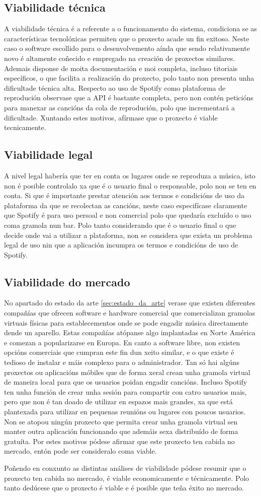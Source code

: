 \subsection{Viabilidade técnica}
A viabilidade técnica é a referente a o funcionamento do sistema, condiciona se as características tecnolóxicas permiten que o proxecto acade un fin exitoso. Neste caso o software escollido para o desenvolvemento aínda que sendo relativamente novo é altamente coñecido e empregado na creación de proxectos similares. Ademais disponse de moita documentación e moi completa, incluso titoriais específicos, o que facilita a realización do proxecto, polo tanto non presenta unha dificultade técnica alta. Respecto ao uso de Spotify como plataforma de reprodución observase que a API é bastante completa, pero non contén peticións para manexar as cancións da cola de reprodución, polo que incrementará a dificultade. Xuntando estes motivos, afírmase que o proxecto é viable tecnicamente.

\subsection{Viabilidade legal}
A nivel legal habería que ter en conta os lugares onde se reproduza a música, isto non é posible controlalo xa que é o usuario final o responsable, polo non se ten en conta. Si que é importante prestar atención aos termos e condicións de uso da plataforma da que se recolectan as cancións, neste caso especifícase claramente que Spotify é para uso persoal e non comercial polo que quedaría excluído o uso coma gramola nun bar. Polo tanto considerando que é o usuario final o que decide onde vai a utilizar a plataforma, non se considera que exista un problema legal de uso nin que a aplicación incumpra os termos e condicións de uso de Spotify.

\subsection{Viabilidade do mercado}
No apartado do estado da arte \ref{sec:estado_da_arte} verase que existen diferentes compañías que ofrecen software e hardware comercial que comercializan gramolas virtuais físicas para establecementos onde se pode engadir música directamente dende un aparello. Estas compañías atópanse algo implantadas en Norte América e comezan a popularizarse en Europa. En canto a software libre, non existen opcións comerciais que cumpran este fin dun xeito similar, e o que existe é tedioso de instalar e máis complexo para o administrador. Tan só hai algúns proxectos ou aplicacións móbiles que de forma xeral crean unha gramola virtual de maneira local para que os usuarios poidan engadir cancións. Incluso Spotify ten unha función de crear unha sesión para compartir con catro usuarios mais, pero que non é tan doado de utilizar en espazos mais grandes, xa que está plantexada para utilizar en pequenas reunións ou lugares con poucos usuarios. Non se atopou ningún proxecto que permita crear unha gramola virtual sen manter outra aplicación funcionando que ademáis sexa distribuído de forma gratuíta. Por estes motivos pódese afirmar que este proxecto ten cabida no mercado, entón pode ser consideralo coma viable.\bigbreak

Poñendo en conxunto as distintas análises de viabilidade pódese resumir que o proxecto ten cabida no mercado, é viable economicamente e técnicamente. Polo tanto dedúcese que o proxecto é viable e é posible que teña éxito no mercado.

